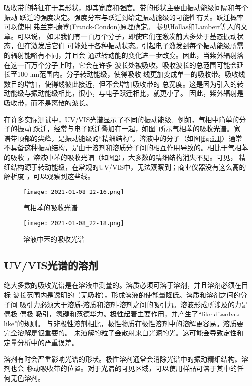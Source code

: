 吸收带的特征在于其形状，即其宽度和强度。带的形状主要由振动能级间隔和每个振动
跃迁的强度决定。强度分布与跃迁到给定振动能级的可能性有关。跃迁概率可以使用
弗兰克-康登(Franck-Condon)原理确定。 参见Hollas和Lambert等人的文章。可以说，
如果我们有一百万个分子，即使它们在激发前大多处于基态振动状态，但在激发后它们
可能处于各种振动状态。引起电子激发到每个振动能级所需的辐射能略有不同，并且会
通过转动能的变化进一步改变。因此，当紫外辐射落在这一百万个分子上时，它会在许多
波长处被吸收。吸收波长的总范围可能会延长至100 nm范围内。分子转动能级，使得吸收
线更加变成单一的吸收带。吸收线数目的增加，使得线彼此接近，但不会增加吸收带的
总宽度。这是因为引入的转动能级与振动能级相比，很小，与电子跃迁相比，就更小了。
因此，紫外辐射是吸收带，而不是离散的波长。

在许多实际测试中，UV/VIS光谱显示了不同的振动能级。例如，气相中简单的分子的振动
跃迁，经常与电子跃迁叠加在一起，如图\ref{fig:5.11}所示气相苯的吸收光谱。宽
谱带顶部的尖峰，是振动能级的“精细结构”。溶液中的分子（如图\ref{fig:5.1}）通常
不具备这种振动结构，是由于溶剂和溶质分子间的相互作用导致的。相比于气相苯的吸收
，溶液中苯的吸收光谱（如图\ref{fig:5.12}），大多数的精细结构消失不见。可见，
精细结构源于转动能级，在常规的UV/VIS中，无法观察到；商业仪器没有这么高的解析度
，可以观察到这些线。
\begin{figure}[htpb]
    \centering
    \texttt{[image: 2021-01-08\_22-16.png]}
    \caption{气相苯的吸收光谱}
    \label{fig:5.11}
\end{figure}
\begin{figure}[htpb]
    \centering
    \texttt{[image: 2021-01-08\_22-18.png]}
    \caption{溶液中苯的吸收光谱}
    \label{fig:5.12}
\end{figure}
\subsection{UV/VIS光谱的溶剂}
绝大多数的吸收光谱是在溶液中测量的。溶质必须可溶于溶剂，并且溶剂必须在目标
波长范围内是透明的（无吸收）。形成溶液的使能量降低。溶质和溶剂之间的分子间
吸引力必须大于溶质-溶质和溶剂-溶剂之间的吸引力。溶液形成所涉及的力是偶极-偶极
吸引，氢键和范德华力。极性起着主要作用，并产生了“like dissolves like”的规则。
与非极性溶剂相比，极性物质在极性溶剂中的溶解更容易。溶质要完全溶解是很重要的。
未溶解的粒子会散射来自光源的光。这可能会导致定性和定量分析中的严重误差。

溶剂有时会严重影响光谱的形状。极性溶剂通常会消除光谱中的振动精细结构。溶剂也会
移动吸收带的位置。对于光谱的可见区域，可以使用样品可溶于其中的任何无色溶剂。

